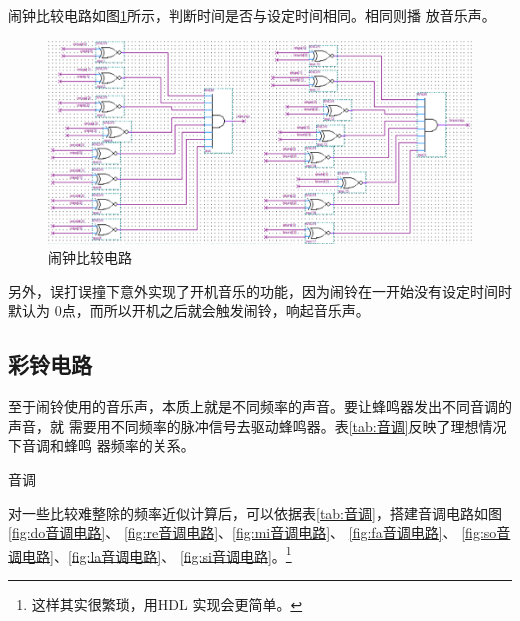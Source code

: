 \documentclass[twoside, openright]{article}
\begin{document}
闹钟比较电路如图\ref{fig:闹钟比较电路}所示，判断时间是否与设定时间相同。相同则播
放音乐声。

\begin{figure}[htbp]
	\centering
	\includegraphics[width = 0.9\linewidth]{alarm.png}
	\caption{闹钟比较电路}
	\label{fig:闹钟比较电路}
\end{figure}

另外，误打误撞下意外实现了开机音乐的功能，因为闹铃在一开始没有设定时间时默认为
0点，而所以开机之后就会触发闹铃，响起音乐声。

\subsection{彩铃电路}%
\label{sub:彩铃电路}

至于闹铃使用的音乐声，本质上就是不同频率的声音。要让蜂鸣器发出不同音调的声音，就
需要用不同频率的脉冲信号去驱动蜂鸣器。表\ref{tab:音调}反映了理想情况下音调和蜂鸣
器频率的关系。

\begin{table}[htbp]
	\centering
	\caption{音调}
	\label{tab:音调}
\end{table}

对一些比较难整除的频率近似计算后，可以依据表\ref{tab:音调}，搭建音调电路如图
\ref{fig:do音调电路}、 \ref{fig:re音调电路}、\ref{fig:mi音调电路}、
\ref{fig:fa音调电路}、 \ref{fig:so音调电路}、\ref{fig:la音调电路}、
\ref{fig:si音调电路}。\footnote{这样其实很繁琐，用HDL 实现会更简单。}
\end{document}
